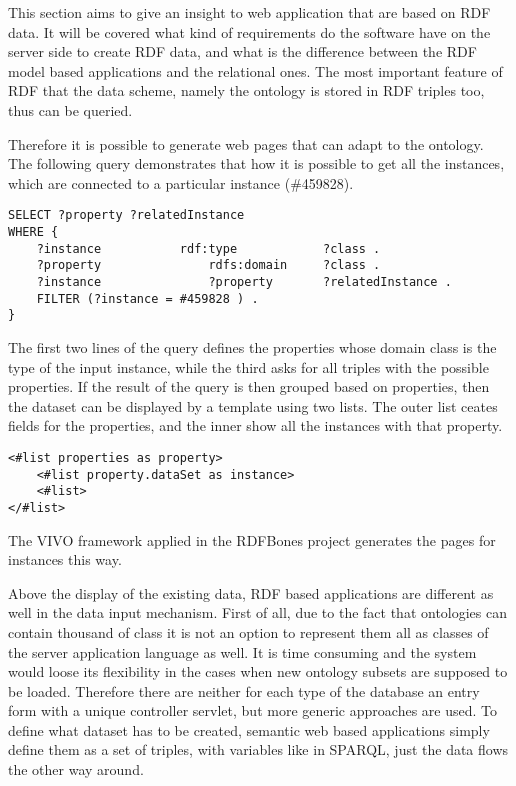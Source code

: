 This section aims to give an insight to web application that are based on RDF data. It will be covered what kind of requirements do the software have on the server side to create RDF data, and what is the difference between the RDF model based applications and the relational ones. The most important feature of RDF that the data scheme, namely the ontology is stored in RDF triples too, thus can be queried.


Therefore it is possible to generate web pages that can adapt to the ontology. The following query demonstrates that how it is possible to get all the instances, which are connected to a particular instance (\#459828).

\begin{lstlisting}[captionpos=b, caption= Dynamic SPARQL query, label=skullJSON, belowskip=1em, aboveskip=2em,
basicstyle=\footnotesize,frame=single]
SELECT ?property ?relatedInstance
WHERE {
	?instance 			rdf:type  			?class .  
	?property				rdfs:domain		?class .
	?instance				?property 		?relatedInstance .
	FILTER (?instance = #459828 ) .
}
\end{lstlisting}

The first two lines of the query defines the properties whose domain class is the type of the input instance, while the third asks for all triples with the possible properties. If the result of the query is then grouped based on properties, then the dataset can be displayed by a template using two lists. The outer list ceates fields for the properties, and the inner show all the instances with that property.


\begin{lstlisting}[captionpos=b, caption=Ontology adaptive template file, label=template,
basicstyle=\footnotesize,frame=single]
<#list properties as property>
	<#list property.dataSet as instance> 
	<#list> 
</#list>
\end{lstlisting}

The VIVO framework applied in the RDFBones project generates the pages for instances this way.


Above the display of the existing data, RDF based applications are different as well in the data input mechanism. First of all, due to the fact that ontologies can contain thousand of class it is not an option to represent them all as classes of the server application language as well. It is time consuming and the system would loose its flexibility in the cases when new ontology subsets are supposed to be loaded. Therefore there are neither for each type of the database an entry form with a unique controller servlet, but more generic approaches are used.
To define what dataset has to be created, semantic web based applications simply define them as a set of triples, with variables like in SPARQL, just the data flows the other way around.


